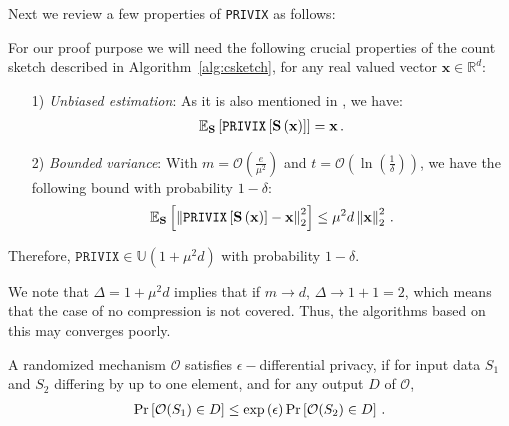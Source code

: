  Next we review a few properties of \texttt{PRIVIX} as follows: 



\begin{property}
For our proof purpose we will need the following crucial properties of the count sketch described in Algorithm~\ref{alg:csketch}, for any real valued vector $\mathbf{x}\in \mathbb{R}^{d}$:
\begin{itemize}
    \item[1)] \emph{Unbiased estimation}: As it is also mentioned in \cite{li2019privacy}, we have:
    \begin{align}\notag
        \mathbb{E}_{\mathbf{S}}\left[\texttt{PRIVIX}\left[\mathbf{S}\left(\mathbf{x}\right)\right]\right]=\mathbf{x}\, .
    \end{align}
    \item[2)] \emph{Bounded variance}: With $m=\mathcal{O}\left(\frac{e}{\mu^2}\right)$ and $t=\mathcal{O}\left(\ln \left(\frac{1}{\delta}\right)\right)$, we have the following bound with probability $1-\delta$:
    \begin{align}\notag
        \mathbb{E}_{\mathbf{S}}\left[\left\|\texttt{PRIVIX}\left[\mathbf{S}\left(\mathbf{x}\right)\right]-\mathbf{x}\right\|_2^2\right]\leq \mu^2 d\left\|\mathbf{x}\right\|_2^2\, .
    \end{align}
\end{itemize}
\end{property}
Therefore, $\texttt{PRIVIX}\in \mathbb{U}(1+\mu^2 d)$ with probability $1-\delta$.
\begin{remark}
We note that $\Delta=1+\mu^2d$ implies that if $m\rightarrow d$, $\Delta\rightarrow 1+1=2$, which means that the case of no compression is not covered. Thus, the algorithms based on this may converges poorly.
\end{remark}

\begin{definition}
A randomized mechanism $\mathcal{O}$ satisfies $\epsilon-$differential privacy, if for input data ${S}_1$ and ${S}_2$ differing by up to one element, and for any output $D$ of $\mathcal{O}$,
\begin{align}\notag
    \Pr\left[\mathcal{O}(S_1)\in D\right]\leq \exp{\left(\epsilon\right)}\Pr\left[\mathcal{O}(S_2)\in D\right] \, .
\end{align}
\end{definition}


